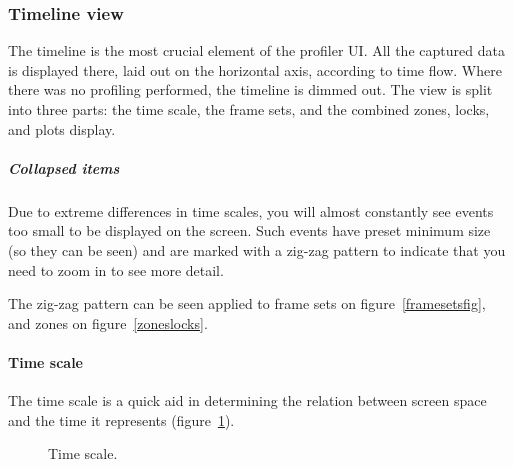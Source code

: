 \documentclass[hidelinks,titlepage,a4paper]{article}
\begin{document}
\subsubsection{Timeline view}

The timeline is the most crucial element of the profiler UI. All the captured data is displayed there, laid out on the horizontal axis, according to time flow. Where there was no profiling performed, the timeline is dimmed out. The view is split into three parts: the time scale, the frame sets, and the combined zones, locks, and plots display.

\subparagraph{Collapsed items}
\label{collapseditems}

Due to extreme differences in time scales, you will almost constantly see events too small to be displayed on the screen. Such events have preset minimum size (so they can be seen) and are marked with a zig-zag pattern to indicate that you need to zoom in to see more detail.

The zig-zag pattern can be seen applied to frame sets on figure~\ref{framesetsfig}, and zones on figure~\ref{zoneslocks}.

\paragraph{Time scale}

The time scale is a quick aid in determining the relation between screen space and the time it represents (figure~\ref{timescale}).

\begin{figure}[h]
\centering{}
\caption{Time scale.}
\label{timescale}
\end{figure}
\end{document}
